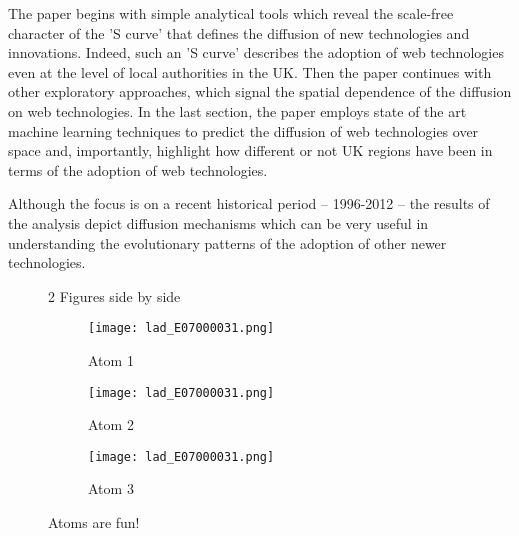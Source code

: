 \documentclass[11pt]{article}
\begin{document}
The paper begins with simple analytical tools which reveal the scale-free character of the 'S curve' that defines the diffusion of new technologies and innovations. Indeed, such an 'S curve' describes the adoption of web technologies even at the level of local authorities in the UK. Then the paper continues with other exploratory approaches, which signal the spatial dependence of the diffusion on web technologies. In the last section, the paper employs state of the art machine learning techniques to predict the diffusion of web technologies over space and, importantly, highlight how different or not UK regions have been in terms of the adoption of web technologies. 

Although the focus is on a recent historical period -- 1996-2012 -- the results of the analysis depict diffusion mechanisms which can be very useful in understanding the evolutionary patterns of the adoption of other newer technologies.

\begin{figure}%
    \centering
    \qquad
    \caption{2 Figures side by side}%
    \label{fig:example}%
\end{figure}

\begin{figure}[H]
	\centering
	\begin{subfigure}{.3\textwidth}
		\texttt{[image: lad\_E07000031.png]}
		\caption{Atom 1}
	\end{subfigure}
	\begin{subfigure}{.3\textwidth}
		\texttt{[image: lad\_E07000031.png]}
		\caption{Atom 2}
	\end{subfigure}
	\begin{subfigure}{.3\textwidth}
		\texttt{[image: lad\_E07000031.png]}
		\caption{Atom 3}
	\end{subfigure}
	\caption{Atoms are fun!}
\end{figure}

%
\end{document}

